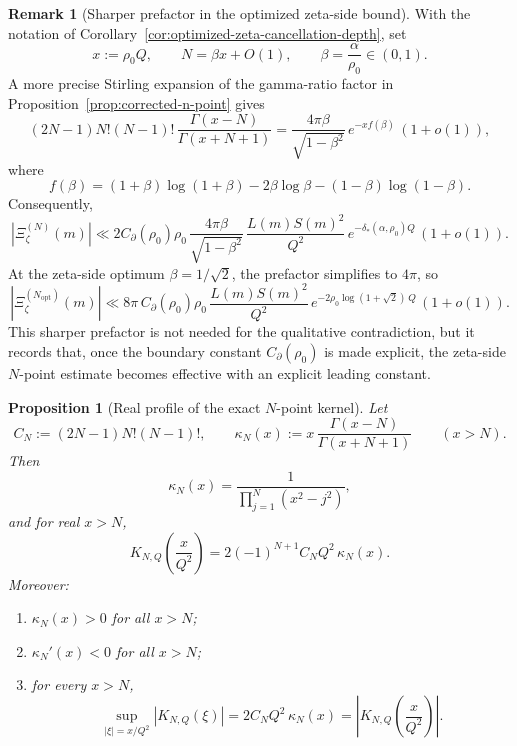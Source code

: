 \documentclass[11pt,a4paper]{amsart}
\theoremstyle{plain}
\newtheorem{proposition}[theorem]{Proposition}
\theoremstyle{definition}
\newtheorem{remark}[theorem]{Remark}
\begin{document}
\begin{remark}[Sharper prefactor in the optimized zeta-side bound]
\label{rem:optimized-zeta-prefactor}
With the notation of Corollary~\ref{cor:optimized-zeta-cancellation-depth},
set
\[
x:=\rho_0Q,
\qquad
N=\beta x+O(1),
\qquad
\beta=\frac{\alpha}{\rho_0}\in(0,1).
\]
A more precise Stirling expansion of the gamma-ratio factor in
Proposition~\ref{prop:corrected-n-point} gives
\[
(2N-1)N!(N-1)!\,\frac{\Gamma(x-N)}{\Gamma(x+N+1)}
=
\frac{4\pi\beta}{\sqrt{1-\beta^2}}\,
e^{-x f(\beta)}\,
(1+o(1)),
\]
where
\[
f(\beta)
=
(1+\beta)\log(1+\beta)
-2\beta\log\beta
-(1-\beta)\log(1-\beta).
\]
Consequently,
\[
|\Xi_\zeta^{(N)}(m)|
\ll
2C_{\partial}(\rho_0)\rho_0\,
\frac{4\pi\beta}{\sqrt{1-\beta^2}}\,
\frac{L(m)S(m)^2}{Q^2}\,
e^{-\delta_*(\alpha,\rho_0)Q}\,
(1+o(1)).
\]
At the zeta-side optimum $\beta=1/\sqrt2$, the prefactor simplifies to
$4\pi$, so
\[
|\Xi_\zeta^{(N_{\mathrm{opt}})}(m)|
\ll
8\pi\,C_{\partial}(\rho_0)\rho_0\,
\frac{L(m)S(m)^2}{Q^2}\,
e^{-2\rho_0\log(1+\sqrt2)\,Q}\,
(1+o(1)).
\]
This sharper prefactor is not needed for the qualitative contradiction, but it
records that, once the boundary constant $C_{\partial}(\rho_0)$ is made
explicit, the zeta-side $N$-point estimate becomes effective with an
explicit leading constant.
\end{remark}

\begin{proposition}[Real profile of the exact $N$-point kernel]
\label{prop:exact-kernel-real-profile}
Let
\[
C_N:=(2N-1)N!(N-1)!,
\qquad
\kappa_N(x):=
x\,\frac{\Gamma(x-N)}{\Gamma(x+N+1)}
\qquad (x>N).
\]
Then
\[
\kappa_N(x)=\frac{1}{\prod_{j=1}^N(x^2-j^2)},
\]
and for real $x>N$,
\[
K_{N,Q}\!\left(\frac{x}{Q^2}\right)
=
2(-1)^{N+1}C_NQ^2\,\kappa_N(x).
\]
Moreover:

\begin{enumerate}
\item $\kappa_N(x)>0$ for all $x>N$;
\item $\kappa_N'(x)<0$ for all $x>N$;
\item for every $x>N$,
\[
\sup_{|\xi|=x/Q^2}|K_{N,Q}(\xi)|
=
2C_NQ^2\,\kappa_N(x)
=
\left|K_{N,Q}\!\left(\frac{x}{Q^2}\right)\right|.
\]
\end{enumerate}
\end{proposition}
\end{document}
